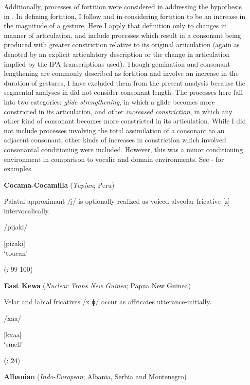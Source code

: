   Additionally, processes of fortition were considered in addressing the hypothesis in . In defining fortition, I follow \citet{Bybee2015b} and \citet{BybeeEasterday2019} in considering fortition to be an increase in the magnitude of a gesture. Here I apply that definition only to changes in manner of articulation, and include processes which result in a consonant being produced with greater constriction relative to its original articulation (again as denoted by an explicit articulatory description or the change in articulation implied by the IPA transcriptions used). Though gemination and consonant lengthening are commonly described as fortition and involve an increase in the duration of gestures, I have excluded them from the present analysis because the segmental analyses in  did not consider consonant length. The processes here fall into two categories: \textit{glide strengthening}, in which a glide becomes more constricted in its articulation, and other \textit{increased constriction}, in which any other kind of consonant becomes more constricted in its articulation. While I did not include processes involving the total assimilation of a consonant to an adjacent consonant, other kinds of increases in constriction which involved consonantal conditioning were included. However, this was a minor conditioning environment in comparison to vocalic and domain environments. See - for examples.

\ea\label{ex:7.9}
  \textbf{Cocama-Cocamilla} (\textit{Tupian}; Peru)

Palatal approximant /j/ is optionally realized as voiced alveolar fricative [z] intervocalically.

/pijaki/

[pizaki]\\
\glt ‘toucan’

(\citealt{VallejosYopán2010}: 99-100)
\z

\ea\label{ex:7.10}
  \textbf{East Kewa} (\textit{Nuclear Trans New Guinea}; Papua New Guinea)

Velar and labial fricatives /x ɸ/ occur as affricates utterance-initially.

/xaa/

[kxaa]\\
\glt ‘smell’

(\citealt{FranklinFranklin1978}: 24)
\z

\ea\label{ex:7.11}
  \textbf{Albanian} (\textit{Indo-European}; Albania, Serbia and Montenegro)

